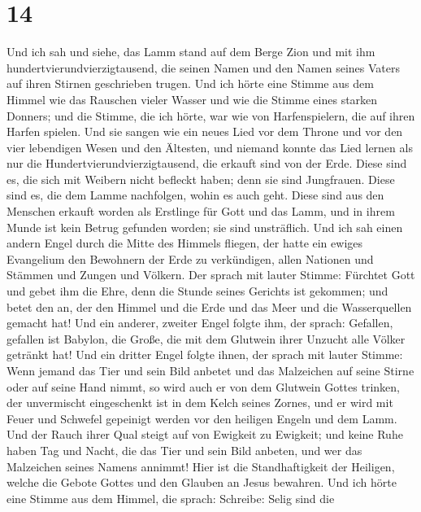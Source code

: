 \hypertarget{section-13}{%
\section{14}\label{section-13}}

 Und ich sah und siehe, das Lamm stand auf dem Berge Zion
und mit ihm hundertvierundvierzigtausend, die seinen Namen und den Namen
seines Vaters auf ihren Stirnen geschrieben trugen.  Und
ich hörte eine Stimme aus dem Himmel wie das Rauschen vieler Wasser und
wie die Stimme eines starken Donners; und die Stimme, die ich hörte, war
wie von Harfenspielern, die auf ihren Harfen spielen.  Und
sie sangen wie ein neues Lied vor dem Throne und vor den vier lebendigen
Wesen und den Ältesten, und niemand konnte das Lied lernen als nur die
Hundertvierundvierzigtausend, die erkauft sind von der Erde.
 Diese sind es, die sich mit Weibern nicht befleckt haben;
denn sie sind Jungfrauen. Diese sind es, die dem Lamme nachfolgen, wohin
es auch geht. Diese sind aus den Menschen erkauft worden als Erstlinge
für Gott und das Lamm,  und in ihrem Munde ist kein Betrug
gefunden worden; sie sind unsträflich.  Und ich sah einen
andern Engel durch die Mitte des Himmels fliegen, der hatte ein ewiges
Evangelium den Bewohnern der Erde zu verkündigen, allen Nationen und
Stämmen und Zungen und Völkern.  Der sprach mit lauter
Stimme: Fürchtet Gott und gebet ihm die Ehre, denn die Stunde seines
Gerichts ist gekommen; und betet den an, der den Himmel und die Erde und
das Meer und die Wasserquellen gemacht hat!  Und ein
anderer, zweiter Engel folgte ihm, der sprach: Gefallen, gefallen ist
Babylon, die Große, die mit dem Glutwein ihrer Unzucht alle Völker
getränkt hat!  Und ein dritter Engel folgte ihnen, der
sprach mit lauter Stimme: Wenn jemand das Tier und sein Bild anbetet und
das Malzeichen auf seine Stirne oder auf seine Hand nimmt,
 so wird auch er von dem Glutwein Gottes trinken, der
unvermischt eingeschenkt ist in dem Kelch seines Zornes, und er wird mit
Feuer und Schwefel gepeinigt werden vor den heiligen Engeln und dem
Lamm.  Und der Rauch ihrer Qual steigt auf von Ewigkeit
zu Ewigkeit; und keine Ruhe haben Tag und Nacht, die das Tier und sein
Bild anbeten, und wer das Malzeichen seines Namens annimmt!
 Hier ist die Standhaftigkeit der Heiligen, welche die
Gebote Gottes und den Glauben an Jesus bewahren.  Und ich
hörte eine Stimme aus dem Himmel, die sprach: Schreibe: Selig sind die
